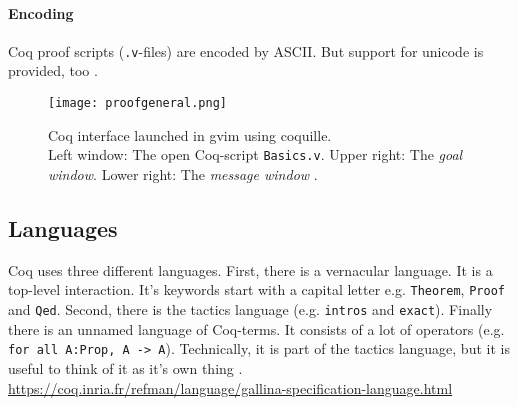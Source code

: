 \paragraph{Encoding }
Coq proof scripts (\texttt{.v}-files) are encoded by ASCII. But support for unicode is provided, too \cite{GallinaSpec}.


\begin{figure}[h]
\texttt{[image: proofgeneral.png]}
\caption{Coq interface launched in gvim using coquille.\\ 
Left window: The open Coq-script \texttt{Basics.v}.
Upper right: The {\itshape goal window}. 
Lower right: The {\itshape message window} \cite{COQIDE}.}
\label{fig:Coquille}
\end{figure}

\subsection{Languages}
Coq uses three different languages. 
First, there is a vernacular language. 
It is a top-level interaction. 
It's keywords start with a capital letter e.g. \lstinline!Theorem!, \lstinline!Proof! and  \lstinline!Qed!. 
Second, there is the tactics language (e.g. \lstinline!intros! and \lstinline!exact!).
Finally there is an unnamed language of Coq-terms. 
It consists of a lot of operators (e.g. \lstinline!for all A:Prop, A -> A!).
Technically, it is part of the tactics language, but it is useful to think of it as it's own thing \cite{coq}.
\url{https://coq.inria.fr/refman/language/gallina-specification-language.html}
